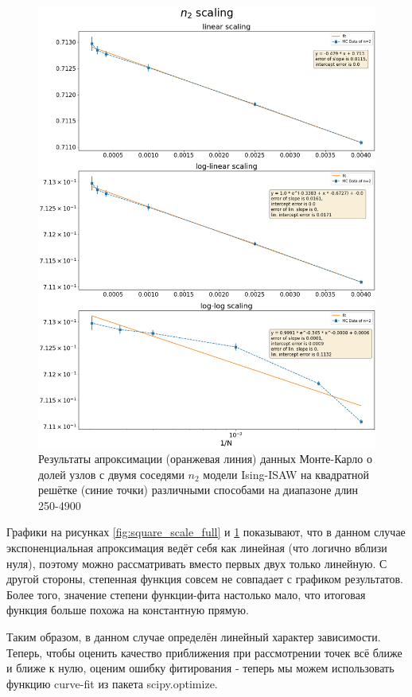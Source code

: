 \begin{figure}[h!]
\begin{minipage}{0.49\textwidth}
    \includegraphics[width=\textwidth]{Sections/Images/square_n2_scaling2.png}
    \caption{Результаты апроксимации (оранжевая линия) данных Монте-Карло о долей узлов с двумя соседями $n_2$ модели Ising-ISAW на квадратной решётке (синие точки) различными способами на диапазоне длин 250-4900}
    \label{fig:square_scale_limited}
\end{minipage}
\end{figure}

Графики на рисунках \ref{fig:square_scale_full} и \ref{fig:square_scale_limited} показывают, что в данном случае экспоненциальная апроксимация ведёт себя как линейная (что логично вблизи нуля), поэтому можно рассматривать вместо первых двух только линейную. С другой стороны, степенная функция совсем не совпадает с графиком результатов. Более того, значение степени функции-фита настолько мало, что итоговая функция больше похожа на константную прямую.

Таким образом, в данном случае определён линейный характер зависимости. Теперь, чтобы оценить качество приближения при рассмотрении точек всё ближе и ближе к нулю, оценим ошибку фитирования - теперь мы можем использовать функцию curve-fit из пакета scipy.optimize.

